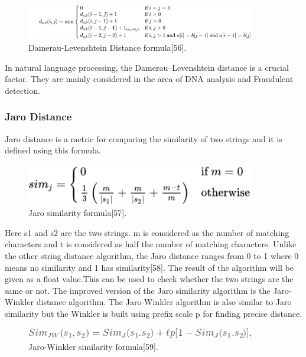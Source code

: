 \begin{figure}[h!]
	\includegraphics[width=10cm]{includes/dlevidist.png}
	\centering
	\caption{ Damerau-Levenshtein Distance formula[56].}
	\label{fig:dlevidist}
\end{figure}
In natural language processing, the Damerau–Levenshtein distance is a crucial factor. They are mainly considered in the area of DNA analysis and Fraudulent detection.
\subsubsection{Jaro Distance}
Jaro distance is a metric for comparing the similarity of two strings and it is defined using this formula.

\begin{figure}[h!]
	\includegraphics[width=10cm]{includes/jaro.png}
	\centering
	\caption{ Jaro similarity formula[57].}
	\label{fig:jaro}
\end{figure}
Here s1 and s2 are the two strings. m is considered as the number of matching characters and t is considered as half the number of matching characters. Unlike the other string distance algorithm, the Jaro distance ranges from 0 to 1 where 0 means no similarity and 1 has similarity[58]. The result of the algorithm will be given as a float value.This can be used to check whether the two strings are the same or not. 
The improved version of the Jaro similarity algorithm is the Jaro-Winkler distance algorithm. The Jaro-Winkler algorithm is also similar to Jaro similarity but the Winkler is built using prefix scale p for finding precise distance.

\begin{figure}[h!]
	\includegraphics[width=10cm]{includes/jarowinkler.png}
	\centering
	\caption{ Jaro-Winkler similarity formula[59].}
	\label{fig:jarowinkler}
\end{figure}